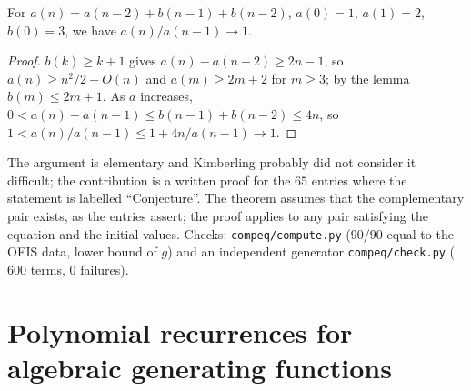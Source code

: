 \begin{proposition}[\oeis{A295070}] For $a(n)=a(n-2)+b(n-1)+b(n-2)$, $a(0)=1$, $a(1)=2$, $b(0)=3$, we have
$a(n)/a(n-1)\to1$.\end{proposition}
\begin{proof} $b(k)\ge k+1$ gives $a(n)-a(n-2)\ge2n-1$, so $a(n)\ge n^2/2-O(n)$ and $a(m)\ge2m+2$ for $m\ge3$; by the
lemma $b(m)\le2m+1$. As $a$ increases, $0<a(n)-a(n-1)\le b(n-1)+b(n-2)\le4n$, so
$1<a(n)/a(n-1)\le1+4n/a(n-1)\to1$. \end{proof}
The argument is elementary and Kimberling probably did not consider it difficult; the contribution is a written
proof for the $65$ entries where the statement is labelled ``Conjecture''. The theorem assumes that the
complementary pair exists, as the entries assert; the proof applies to any pair satisfying the equation and the
initial values. Checks: \texttt{compeq/compute.py} (90/90 equal to the OEIS data, lower bound of $g$) and an
independent generator \texttt{compeq/check.py} ($600$ terms, $0$ failures).

\section{Polynomial recurrences for algebraic generating functions}\label{s:precalg}
